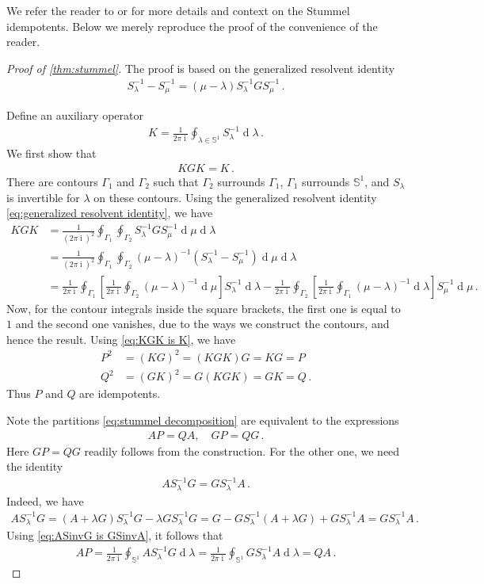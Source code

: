 \documentclass[a4paper,10pt]{article}
\numberwithin{equation}{section}
\theoremstyle{plain}
\theoremstyle{plain}
\theoremstyle{plain}
\theoremstyle{plain}
\theoremstyle{plain}
\theoremstyle{remark}
\theoremstyle{definition}
\theoremstyle{plain}
\newcommand{\ii}{\operatorname{i}}
\newcommand{\bS}{\mathbb{S}}
\newcommand{\dif}{\operatorname{d}}
\newcommand{\eq}[1]{\begin{align*}#1\end{align*}}
\newcommand{\eql}[1]{\begin{align}#1\end{align}}
\begin{document}
		We refer the reader to \cite{stummel1971diskrete} or \cite[Chapter IV]{gohberg2013classes} for more details and context on the Stummel idempotents. Below we merely reproduce the proof of the convenience of the reader.
		\begin{proof}[Proof of \cref{thm:stummel}]
			The proof is based on the generalized resolvent identity \eql{S_\lambda^{-1}-S_{\mu}^{-1}=(\mu-\lambda)S_{\lambda}^{-1}GS_\mu^{-1}\,. \label{eq:generalized resolvent identity}} %
			
			Define an auxiliary operator \eql{K=\frac{1}{2\pi \ii}\oint_{\lambda\in\bS^1}S_\lambda^{-1}\dif{\lambda}\,. \label{eq:stummel auxilary operator}} We first show that 
			\eql{\label{eq:KGK is K}KGK=K\,.} There are contours $\Gamma_1$ and $\Gamma_2$ such that $\Gamma_2$ surrounds $\Gamma_1$, $\Gamma_1$ surrounds $\bS^1$, and $S_\lambda$ is invertible for $\lambda$ on these contours. Using the generalized resolvent identity \cref{eq:generalized resolvent identity}, we have \eq{KGK & =\frac{1}{(2\pi\ii)^2} \oint_{\Gamma_1}\oint_{\Gamma_2} S_\lambda^{-1}GS_\mu^{-1}\dif{\mu}\dif{\lambda} \\ &= \frac{1}{(2\pi\ii)^2} \oint_{\Gamma_1}\oint_{\Gamma_2} (\mu-\lambda)^{-1}(S_\lambda^{-1}-S_{\mu}^{-1}) \dif{\mu}\dif{\lambda} \\ &= \frac{1}{2\pi\ii} \oint_{\Gamma_1} \left[\frac{1}{2\pi\ii}\oint_{\Gamma_2} (\mu-\lambda)^{-1} \dif{\mu}\right] S_\lambda^{-1} \dif{\lambda} - \frac{1}{2\pi\ii} \oint_{\Gamma_2} \left[\frac{1}{2\pi\ii} \oint_{\Gamma_1} (\mu-\lambda)^{-1}\dif{\lambda}\right] S_{\mu}^{-1} \dif{\mu}\,.} Now, for the contour integrals inside the square brackets, the first one is equal to $1$ and the second one vanishes, due to the ways we construct the contours, and hence the result. Using \cref{eq:KGK is K}, we have \eq{P^2&=(KG)^2=(KGK)G=KG=P \\ Q^2&=(GK)^2=G(KGK)=GK=Q \,.} Thus $P$ and $Q$ are idempotents.
			
			Note the partitions \cref{eq:stummel decomposition} are equivalent to the expressions \eq{AP=QA,\quad GP=QG\,.} Here $GP=QG$ readily follows from the construction. For the other one, we need the identity \eql{AS_\lambda^{-1}G=GS_{\lambda}^{-1}A\,. \label{eq:ASinvG is GSinvA}} Indeed, we have \eq{AS_{\lambda}^{-1}G=(A+\lambda G)S_{\lambda}^{-1}G - \lambda G S_\lambda^{-1}G = G-GS_\lambda^{-1}(A+\lambda G) + GS_\lambda^{-1}A =  GS_\lambda^{-1}A \,.} Using \cref{eq:ASinvG is GSinvA}, it follows that \eq{AP=\frac{1}{2\pi \ii}\oint_{\bS^1}AS_\lambda^{-1}G\dif{\lambda} = \frac{1}{2\pi \ii}\oint_{\bS^1}GS_\lambda^{-1}A\dif{\lambda}=QA\,.}
			

\end{proof}
\end{document}
